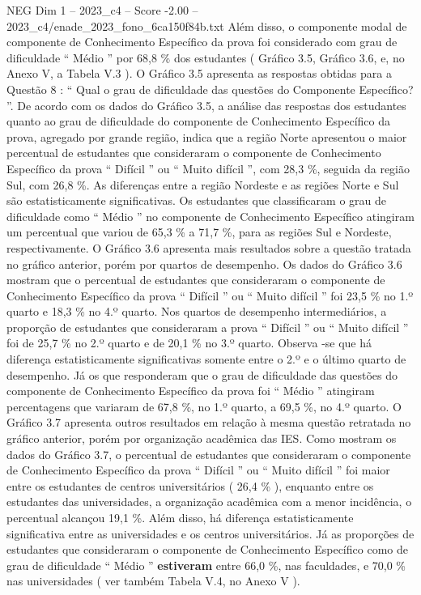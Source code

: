 \begin{textsample}{NEG Dim 1 – 2023\_c4 – Score -2.00 – 2023\_c4/enade\_2023\_fono\_6ca150f84b.txt}
Além disso, o componente modal de componente de Conhecimento Específico da prova foi considerado com grau de dificuldade “ Médio ” por 68,8 \% dos estudantes ( Gráfico 3.5, Gráfico 3.6, e, no Anexo V, a Tabela V.3 ).
O Gráfico 3.5 apresenta as respostas obtidas para a Questão 8 : “ Qual o grau de dificuldade das questões do Componente Específico? ”.
De acordo com os dados do Gráfico 3.5, a análise das respostas dos estudantes quanto ao grau de dificuldade do componente de Conhecimento Específico da prova, agregado por grande região, indica que a região Norte apresentou o maior percentual de estudantes que consideraram o componente de Conhecimento Específico da prova “ Difícil ” ou “ Muito difícil ”, com 28,3 \%, seguida da região Sul, com 26,8 \%.
As diferenças entre a região Nordeste e as regiões Norte e Sul são estatisticamente significativas.
Os estudantes que classificaram o grau de dificuldade como “ Médio ” no componente de Conhecimento Específico atingiram um percentual que variou de 65,3 \% a 71,7 \%, para as regiões Sul e Nordeste, respectivamente.
O Gráfico 3.6 apresenta mais resultados sobre a questão tratada no gráfico anterior, porém por quartos de desempenho.
Os dados do Gráfico 3.6 mostram que o percentual de estudantes que consideraram o componente de Conhecimento Específico da prova “ Difícil ” ou “ Muito difícil ” foi 23,5 \% no 1.º quarto e 18,3 \% no 4.º quarto.
Nos quartos de desempenho intermediários, a proporção de estudantes que consideraram a prova “ Difícil ” ou “ Muito difícil ” foi de 25,7 \% no 2.º quarto e de 20,1 \% no 3.º quarto.
Observa -se que há diferença estatisticamente significativas somente entre o 2.º e o último quarto de desempenho.
Já os que responderam que o grau de dificuldade das questões do componente de Conhecimento Específico da prova foi “ Médio ” atingiram percentagens que variaram de 67,8 \%, no 1.º quarto, a 69,5 \%, no 4.º quarto.
O Gráfico 3.7 apresenta outros resultados em relação à mesma questão retratada no gráfico anterior, porém por organização acadêmica das IES.
Como mostram os dados do Gráfico 3.7, o percentual de estudantes que consideraram o componente de Conhecimento Específico da prova “ Difícil ” ou “ Muito difícil ” foi maior entre os estudantes de centros universitários ( 26,4 \% ), enquanto entre os estudantes das universidades, a organização acadêmica com a menor incidência, o percentual alcançou 19,1 \%.
Além disso, há diferença estatisticamente significativa entre as universidades e os centros universitários.
Já as proporções de estudantes que consideraram o componente de Conhecimento Específico como de grau de dificuldade “ Médio ” \textbf{estiveram} entre 66,0 \%, nas faculdades, e 70,0 \% nas universidades ( ver também Tabela V.4, no Anexo V ).

\end{textsample}
